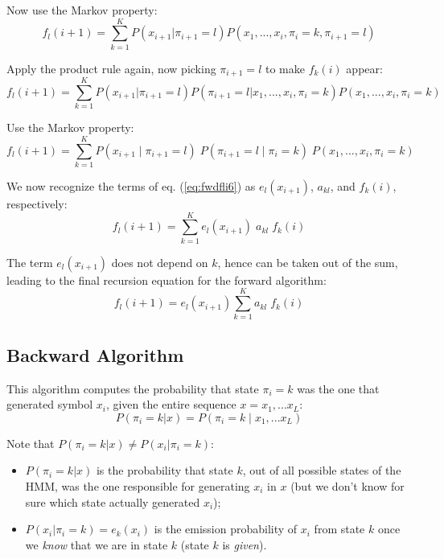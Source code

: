Now use the Markov property:
\begin{equation}
f_l(i+1) = \sum_{k=1}^K 
P(x_{i+1} | \pi_{i+1} = l)
P(x_1,..., x_i,  \pi_i=k, \pi_{i+1} = l)
\label{eq:fwdfli4}
\end{equation}

Apply the product rule again, now picking $\pi_{i+1} = l$ to make $f_k(i)$ appear:
\begin{equation}
f_l(i+1) = \sum_{k=1}^K 
P(x_{i+1} | \pi_{i+1} = l)
P(\pi_{i+1} = l | x_1,..., x_i,  \pi_i=k)
P(x_1,..., x_i,  \pi_i=k)
\label{eq:fwdfli5}
\end{equation}

Use the Markov property:
\begin{equation}
f_l(i+1) = \sum_{k=1}^K 
P(x_{i+1} \; | \; \pi_{i+1} = l) \;
P(\pi_{i+1} = l \; | \; \pi_i=k) \;
P(x_1,..., x_i, \pi_i=k)
\label{eq:fwdfli6}
\end{equation}

We now recognize the terms of eq. (\ref{eq:fwdfli6}) as $e_l(x_{i+1})$, $a_{kl}$, and $f_k(i)$, respectively:
\begin{equation}
f_l(i+1) = \sum_{k=1}^K e_l(x_{i+1}) \; a_{kl} \; f_k(i)
\label{eq:fwdfli7}
\end{equation}

The term $e_l(x_{i+1})$ does not depend on $k$, hence can be taken out of the sum, leading to the final recursion equation for the forward algorithm:
\begin{equation}
\boxed{f_l(i+1) = e_l(x_{i+1}) \sum_{k=1}^K a_{kl} \; f_k(i) }
\label{eq:fwdrecursion}
\end{equation}

\subsection{Backward Algorithm}

This algorithm computes the probability that state $\pi_i = k$ was the one that generated symbol $x_i$, given the entire sequence $x = x_1, ... x_L$:
\begin{equation}
\boxed{P(\pi_i = k | x) = P(\pi_i = k \; | \; x_1, ... x_L)}
\label{eq:bk0}
\end{equation}

Note that $P(\pi_i = k | x) \ne P(x_i | \pi_i = k)$:
\begin{itemize}
\item $P(\pi_i = k | x)$ is the probability that state $k$, out of all possible states of the HMM, was the one responsible for generating $x_i$ in $x$ (but we don't know for sure which state actually generated $x_i$);
\item $P(x_i | \pi_i = k) = e_k(x_i)$ is the emission probability of $x_i$ from state $k$ once we {\em know} that we are in state $k$ (state $k$ is {\em given}).
\end{itemize}

